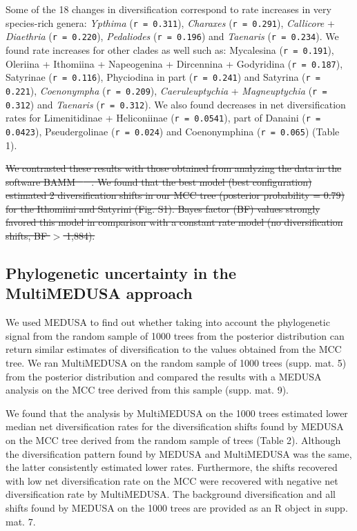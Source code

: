 \documentclass[10pt]{article}
\providecommand{\DIFdeltex}[1]{{\protect\color{red}\sout{#1}}}                      %
\providecommand{\DIFdelbegin}{} %
\providecommand{\DIFdelend}{} %
\providecommand{\DIFdel}[1]{\texorpdfstring{\DIFdeltex{#1}}{}} %
\begin{document}
Some of the 18 changes in diversification correspond to rate increases
in very species-rich genera: \emph{Ypthima} (\texttt{r = 0.311}),
\emph{Charaxes} (\texttt{r = 0.291}), \emph{Callicore} +
\emph{Diaethria} (\texttt{r = 0.220}), \emph{Pedaliodes}
(\texttt{r = 0.196}) and \emph{Taenaris} (\texttt{r = 0.234}). We found
rate increases for other clades as well such as: Mycalesina
(\texttt{r = 0.191}), Oleriina + Ithomiina + Napeogenina + Dircennina +
Godyridina (\texttt{r = 0.187}), Satyrinae (\texttt{r = 0.116}),
Phyciodina in part (\texttt{r = 0.241}) and Satyrina
(\texttt{r = 0.221}), \emph{Coenonympha} (\texttt{r = 0.209}),
\emph{Caeruleuptychia} + \emph{Magneuptychia} (\texttt{r = 0.312}) and
\emph{Taenaris} (\texttt{r = 0.312}). We also found decreases in net
diversification rates for Limenitidinae + Heliconiinae
(\texttt{r = 0.0541}), part of Danaini (\texttt{r = 0.0423}),
Pseudergolinae (\texttt{r = 0.024}) and Coenonymphina
(\texttt{r = 0.065}) (Table 1).


\DIFdelbegin \DIFdel{We contrasted these results with those obtained from analyzing the data
in the software BAMM \mbox{%
\cite{rabosky20140}
}%
. We found that the best model (best
configuration) estimated 2 diversification shifts in our MCC tree
(posterior probability = 0.79) for the Ithomiini and Satyrini (Fig. S1).
Bayes factor (BF) values strongly favored this model in comparison with
a constant rate model (no diversification shifts, BF \(>\) 1,884).
}%

\DIFdelend \subsection*{Phylogenetic uncertainty in the MultiMEDUSA
approach}

We used MEDUSA to find out whether taking into account the phylogenetic
signal from the random sample of 1000 trees from the posterior
distribution can return similar estimates of diversification to the
values obtained from the MCC tree. We ran MultiMEDUSA on the random
sample of 1000 trees (supp. mat. 5) from the posterior distribution and
compared the results with a MEDUSA analysis on the MCC tree derived from
this sample (supp. mat. 9).

We found that the analysis by MultiMEDUSA on the 1000 trees estimated
lower median net diversification rates for the diversification shifts
found by MEDUSA on the MCC tree derived from the random sample of trees
(Table 2). Although the diversification pattern found by MEDUSA and
MultiMEDUSA was the same, the latter consistently estimated lower rates.
Furthermore, the shifts recovered with low net diversification rate on
the MCC were recovered with negative net diversification rate by
MultiMEDUSA. The background diversification and all shifts found by
MEDUSA on the 1000 trees are provided as an R object in supp. mat. 7.
\end{document}
